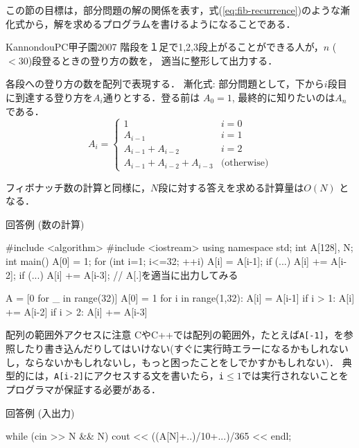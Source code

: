 この節の目標は，部分問題の解の関係を表す，式(\ref{eq:fib-recurrence})のような漸化式から，解を求めるプログラムを書けるようになることである．


\begin{psbox}{Kannondou}{PC甲子園2007}
階段を１足で1,2,3段上がることができる人が，$n$ ($<30$)段登るときの登り方の数を，
適当に整形して出力する．

\end{psbox}

各段への登り方の数を配列で表現する．
漸化式: 部分問題として，下から$i$段目に到達する登り方を$A_i$通りとする．登る前は
$A_0=1$, 最終的に知りたいのは$A_n$である．\\
\begin{equation}
  A_i = \left\{
  \begin{array}{ll}
    1 & i=0\\
    A_{i-1} & i=1\\
    A_{i-1}+A_{i-2} & i=2\\
    A_{i-1}+A_{i-2}+A_{i-3} & \mbox{(otherwise)}
  \end{array}\right.
\end{equation}

フィボナッチ数の計算と同様に，$N$段に対する答えを求める計算量は$O(N)$
となる．

回答例 (数の計算)
\begin{cbox}
#include <algorithm>
#include <iostream>
using namespace std;
int A[128], N;
int main() {
    A[0] = 1;
    for (int i=1; i<=32; ++i) {
        A[i] = A[i-1];
        if (...) A[i] += A[i-2];
        if (...) A[i] += A[i-3];
    }
    // A[.]を適当に出力してみる
}
\end{cbox}

\begin{pybox}
A = [0 for _ in range(32)]
A[0] = 1
for i in range(1,32):
    A[i] = A[i-1]
    if i > 1:
        A[i] += A[i-2]
        if i > 2:
            A[i] += A[i-3]  
\end{pybox}


\begin{debugbox}{配列の範囲外アクセスに注意}
  CやC++では配列の範囲外，たとえば\texttt{A[-1]}，を参照したり書き込んだりしてはいけない(すぐに実行時エラーになるかもしれないし，ならないかもしれないし，もっと困ったことをしでかすかもしれない)． 典型的には，\texttt{A[i-2]}にアクセスする文を書いたら，\texttt{i}$\le 1$では実行されないことをプログラマが保証する必要がある．
\end{debugbox}


回答例 (入出力)
\begin{cbox}
    while (cin >> N && N) 
        cout << ((A[N]+..)/10+...)/365 << endl;
\end{cbox}

